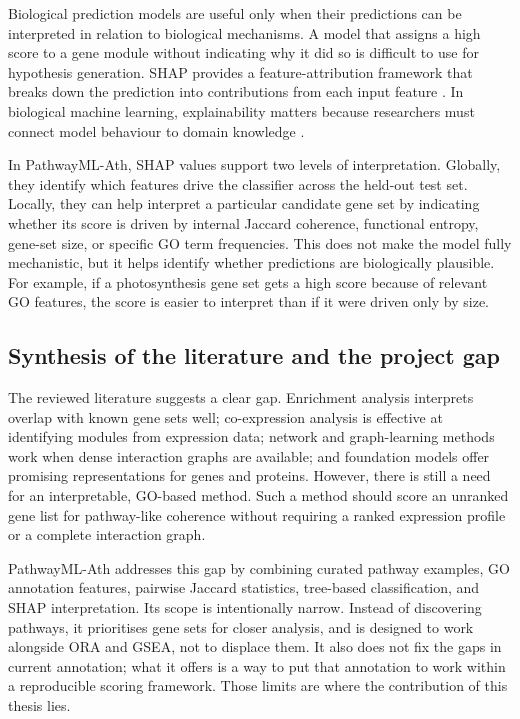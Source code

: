 \documentclass[12pt,twoside]{article}
\begin{document}
Biological prediction models are useful only when their predictions can be interpreted in relation to biological mechanisms. A model that assigns a high score to a gene module without indicating why it did so is difficult to use for hypothesis generation. SHAP provides a feature-attribution framework that breaks down the prediction into contributions from each input feature \citep{lundberg2017unified}. In biological machine learning, explainability matters because researchers must connect model behaviour to domain knowledge \citep{strudwick2025autoxai4omics}.

In PathwayML-Ath, SHAP values support two levels of interpretation. Globally, they identify which features drive the classifier across the held-out test set. Locally, they can help interpret a particular candidate gene set by indicating whether its score is driven by internal Jaccard coherence, functional entropy, gene-set size, or specific GO term frequencies. This does not make the model fully mechanistic, but it helps identify whether predictions are biologically plausible. For example, if a photosynthesis gene set gets a high score because of relevant GO features, the score is easier to interpret than if it were driven only by size.

\subsection{Synthesis of the literature and the project gap}
\label{sec:lit_synthesis}

The reviewed literature suggests a clear gap. Enrichment analysis interprets overlap with known gene sets well; co-expression analysis is effective at identifying modules from expression data; network and graph-learning methods work when dense interaction graphs are available; and foundation models offer promising representations for genes and proteins. However, there is still a need for an interpretable, GO-based method. Such a method should score an unranked gene list for pathway-like coherence without requiring a ranked expression profile or a complete interaction graph.

PathwayML-Ath addresses this gap by combining curated pathway examples, GO annotation features, pairwise Jaccard statistics, tree-based classification, and SHAP interpretation. Its scope is intentionally narrow. Instead of discovering pathways, it prioritises gene sets for closer analysis, and is designed to work alongside ORA and GSEA, not to displace them. It also does not fix the gaps in current annotation; what it offers is a way to put that annotation to work within a reproducible scoring framework. Those limits are where the contribution of this thesis lies.
\end{document}
